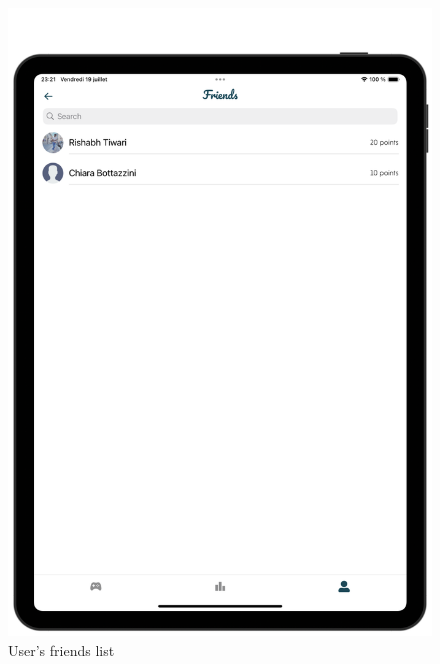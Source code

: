 \begin{figure}[H]
    \centering
    \begin{minipage}[b]{0.43\linewidth}
        \centering
        \includegraphics[width=\linewidth]{TabletUI/User's friends list.png}
        \caption{User's friends list}
    \end{minipage}
    \hspace{0.1\linewidth}
    \begin{minipage}[b]{0.43\linewidth}
        \centering

\end{minipage}
\end{figure}
